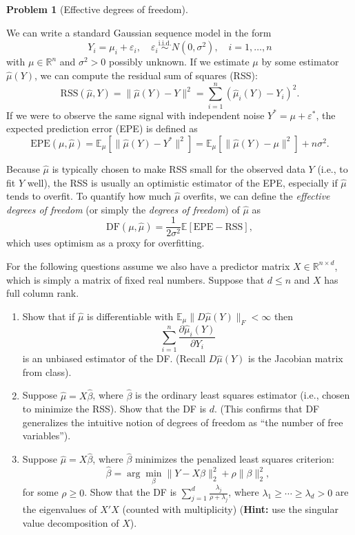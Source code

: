 \documentclass{article}
\newcommand{\EE}{\mathbb{E}}
\newcommand{\RR}{\mathbb{R}}
\newcommand{\simiid}{\overset{\text{i.i.d.}}{\sim}}
\newcommand{\ep}{\varepsilon}
\theoremstyle{definition}
\newtheorem{problem}{Problem}
\begin{document}
\begin{problem}[Effective degrees of freedom]
\label{prob:expected-df}

We can write a standard Gaussian sequence model in the form
\[
Y_i = \mu_i + \ep_i, \quad \ep_i \simiid N(0,\sigma^2), \quad i = 1,\ldots,n
\]
with $\mu\in\RR^n$ and $\sigma^2 > 0$ possibly unknown. If we estimate $\mu$ by some estimator $\hat\mu(Y)$, we can compute the residual sum of squares (RSS):
\[
\text{RSS}(\hat\mu,Y) = \|\hat\mu(Y)-Y\|^2 = \sum_{i=1}^n (\hat\mu_i(Y) - Y_i)^2.
\]
If we were to observe the same signal with independent noise $Y^* = \mu + \ep^*$, the expected prediction error (EPE) is defined as
\[
\text{EPE}(\mu,\hat\mu) = \EE_\mu\left[\| \hat\mu(Y) - Y^*\|^2\right] = \EE_\mu\left[\|\hat\mu(Y)-\mu\|^2\right] + n\sigma^2.
\]

Because $\hat\mu$ is typically chosen to make RSS small for the observed data $Y$ (i.e., to fit $Y$ well), the RSS is usually an optimistic estimator of the EPE, especially if $\hat\mu$ tends to overfit. To quantify how much $\hat\mu$ overfits, we can define the {\em effective degrees of freedom} (or simply the {\em degrees of freedom}) of $\hat\mu$ as
\[
\text{DF}(\mu,\hat\mu) = \frac{1}{2\sigma^2}\EE\left[\text{EPE} - \text{RSS}\right],
\]
which uses optimism as a proxy for overfitting.

For the following questions assume we also have a predictor matrix $X\in \RR^{n\times d}$, which is simply a matrix of fixed real numbers. Suppose that $d\leq n$ and $X$ has full column rank. 

\begin{enumerate}[label=(\alph*)]
\item Show that if $\hat\mu$ is differentiable with $\EE_\mu\|D\hat\mu(Y)\|_F < \infty$ then
\[
\sum_{i=1}^n \frac{\partial \hat\mu_i(Y)}{\partial Y_i}
\]
is an unbiased estimator of the DF. (Recall $D\hat\mu(Y)$ is the Jacobian matrix from class).




\item Suppose $\hat\mu = X\hat\beta$, where $\hat\beta$ is the ordinary least squares estimator (i.e., chosen to minimize the RSS). Show that the DF is $d$. (This confirms that DF generalizes the intuitive notion of degrees of freedom as ``the number of free variables'').




\item Suppose $\hat\mu = X\hat\beta$, where $\hat\beta$ minimizes the penalized least squares criterion:
\[
\hat\beta = \arg\min_\beta \|Y - X\beta\|_2^2 + \rho \|\beta\|_2^2,
\]
for some $\rho \geq 0$. Show that the DF is $\sum_{j=1}^d \frac{\lambda_j}{\rho+\lambda_j}$, where $\lambda_1 \geq \cdots \geq \lambda_d > 0$ are the eigenvalues of $X'X$ (counted with multiplicity) ({\bf Hint:} use the singular value decomposition of $X$).





\end{enumerate}
\end{problem}
\end{document}
